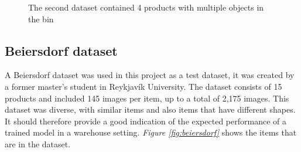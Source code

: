 \begin{figure}[h]
    \hspace{2 cm}
    \hspace{2 cm}
    
    \caption{The second dataset contained 4 products with multiple objects in the bin}
    \label{figure: multiproducts}
\end{figure}

\subsection{Beiersdorf dataset}\label{sec:beiersdorfdataset}
A Beiersdorf dataset\cite{bjarnason_detecting_2021} was used in this project as a test dataset, it was created by a former master's student in Reykjavík University. 
The dataset consists of 15 products and included 145 images per item, up to a total of 2,175 images. This dataset was diverse, with similar items and also items that have different shapes. It should therefore provide a good indication of the expected performance of a trained model in a warehouse setting. \textit{Figure \ref{fig:beiersdorf}} shows the items that are in the dataset.



